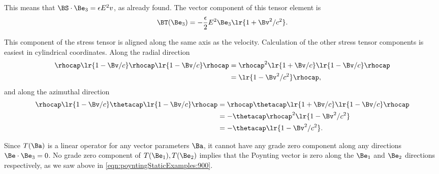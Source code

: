This means that \( \BS \cdot \Be_3 = \epsilon E^2 v \), as already found.  The vector component of this tensor element is
\begin{equation}\label{eqn:poyntingStaticExamples:1000}
\BT(\Be_3) =
- \frac{\epsilon}{2} E^2 \Be_3 \lr{1 + \Bv^2/c^2 }.
\end{equation}

This component of the stress tensor is aligned along the same axis as the velocity.
Calculation of the other stress tensor components is easiest in cylindrical coordinates.  Along the radial direction
\begin{equation}\label{eqn:poyntingStaticExamples:1020}
\begin{aligned}
\rhocap \lr{ 1 - \Bv/c } \rhocap \lr{1 - \Bv/c} \rhocap
&=
\rhocap^2 \lr{ 1 + \Bv/c} \lr{1 - \Bv/c} \rhocap \\
&= \lr{1 - \Bv^2/c^2} \rhocap,
\end{aligned}
\end{equation}
and along the azimuthal direction
\begin{equation}\label{eqn:poyntingStaticExamples:1100}
\begin{aligned}
\rhocap \lr{ 1 - \Bv/c } \thetacap \lr{1 - \Bv/c} \rhocap
&=
\rhocap \thetacap \lr{1 + \Bv/c} \lr{1 - \Bv/c} \rhocap \\
&=
-\thetacap \rhocap^2 \lr{1 - \Bv^2/c^2} \\
&=
-\thetacap \lr{1 - \Bv^2/c^2}.
\end{aligned}
\end{equation}

Since \( T(\Ba) \) is a linear operator for any vector parameters \( \Ba \), it cannot have any grade zero component along any directions \( \Be \cdot \Be_3 = 0 \).
No grade zero component of \( T(\Be_1), T(\Be_2) \) implies that the Poynting vector is zero along the \( \Be_1 \) and \( \Be_2 \) directions respectively, as we saw above in
\cref{eqn:poyntingStaticExamples:900}.
%
%
%

